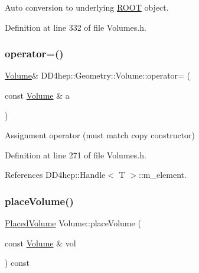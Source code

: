 Auto conversion to underlying \hyperlink{namespace_r_o_o_t}{R\+O\+OT} object. 



Definition at line 332 of file Volumes.\+h.

\hypertarget{class_d_d4hep_1_1_geometry_1_1_volume_af071e34d365d16c7f7dfe5b2fe59d520}{}\label{class_d_d4hep_1_1_geometry_1_1_volume_af071e34d365d16c7f7dfe5b2fe59d520} 
\subsubsection{\texorpdfstring{operator=()}{operator=()}}
{\footnotesize\ttfamily \hyperlink{class_d_d4hep_1_1_geometry_1_1_volume}{Volume}\& D\+D4hep\+::\+Geometry\+::\+Volume\+::operator= (\begin{DoxyParamCaption}\item[{const \hyperlink{class_d_d4hep_1_1_geometry_1_1_volume}{Volume} \&}]{a }\end{DoxyParamCaption})\hspace{0.3cm}{\ttfamily [inline]}}



Assignment operator (must match copy constructor) 



Definition at line 271 of file Volumes.\+h.



References D\+D4hep\+::\+Handle$<$ T $>$\+::m\+\_\+element.

\hypertarget{class_d_d4hep_1_1_geometry_1_1_volume_a6c42869a9a111bbad79e8f0f5813b16b}{}\label{class_d_d4hep_1_1_geometry_1_1_volume_a6c42869a9a111bbad79e8f0f5813b16b} 
\subsubsection{\texorpdfstring{place\+Volume()}{placeVolume()}\hspace{0.1cm}{\footnotesize\ttfamily [1/5]}}
{\footnotesize\ttfamily \hyperlink{class_d_d4hep_1_1_geometry_1_1_placed_volume}{Placed\+Volume} Volume\+::place\+Volume (\begin{DoxyParamCaption}\item[{const \hyperlink{class_d_d4hep_1_1_geometry_1_1_volume}{Volume} \&}]{vol }\end{DoxyParamCaption}) const}



